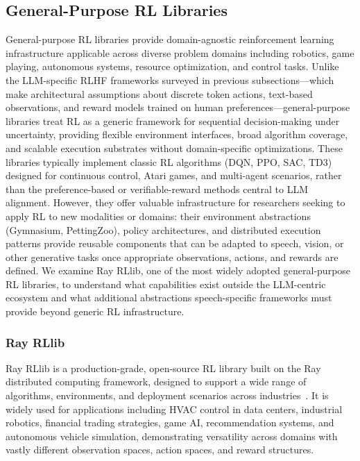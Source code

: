 \documentclass[conference]{IEEEtran}
\begin{document}
\subsection{General-Purpose RL Libraries}

General-purpose RL libraries provide domain-agnostic reinforcement learning infrastructure applicable across diverse problem domains including robotics, game playing, autonomous systems, resource optimization, and control tasks. Unlike the LLM-specific RLHF frameworks surveyed in previous subsections—which make architectural assumptions about discrete token actions, text-based observations, and reward models trained on human preferences—general-purpose libraries treat RL as a generic framework for sequential decision-making under uncertainty, providing flexible environment interfaces, broad algorithm coverage, and scalable execution substrates without domain-specific optimizations. These libraries typically implement classic RL algorithms (DQN, PPO, SAC, TD3) designed for continuous control, Atari games, and multi-agent scenarios, rather than the preference-based or verifiable-reward methods central to LLM alignment. However, they offer valuable infrastructure for researchers seeking to apply RL to new modalities or domains: their environment abstractions (Gymnasium, PettingZoo), policy architectures, and distributed execution patterns provide reusable components that can be adapted to speech, vision, or other generative tasks once appropriate observations, actions, and rewards are defined. We examine Ray RLlib, one of the most widely adopted general-purpose RL libraries, to understand what capabilities exist outside the LLM-centric ecosystem and what additional abstractions speech-specific frameworks must provide beyond generic RL infrastructure.

\subsubsection{Ray RLlib}

Ray RLlib is a production-grade, open-source RL library built on the Ray distributed computing framework, designed to support a wide range of algorithms, environments, and deployment scenarios across industries~\cite{rllib-paper, rllib-docs}. It is widely used for applications including HVAC control in data centers, industrial robotics, financial trading strategies, game AI, recommendation systems, and autonomous vehicle simulation, demonstrating versatility across domains with vastly different observation spaces, action spaces, and reward structures.
\end{document}
